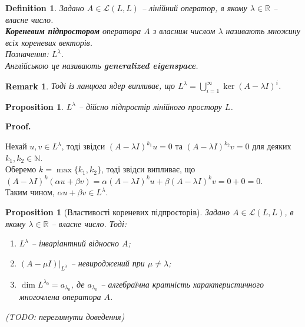 \documentclass[a4paper, 10pt]{article}
\makeatletter
\theoremstyle{theoremdd}
\newtheorem{definition}[theorem]{Definition}
\newtheorem{proposition}[theorem]{Proposition}
\newtheorem{remark}[theorem]{Remark}
\renewenvironment{proof}[1][Proof.\\]{\par
\pushQED{\hfill \qed}%
\normalfont \topsep6\p@\@plus6\p@\relax
\trivlist
\item\relax
{\bfseries
#1\@addpunct{.}}\hspace\labelsep\ignorespaces
}{%
\popQED\endtrivlist\@endpefalse
}
\makeatother
\begin{document}
\begin{definition}
Задано $A \in \mathcal{L}(L,L)$ -- лінійний оператор, в якому $\lambda \in \mathbb{R}$ -- власне число.\\
\textbf{Кореневим підпростором} оператора $A$ з власним числом $\lambda$ називають множину всіх кореневих векторів.\\
Позначення: $L^\lambda$.\\
Англійською це називають \textbf{generalized eigenspace}.
\end{definition}

\begin{remark}
Тоді із ланцюга ядер випливає, що $L^\lambda = \displaystyle\bigcup_{i=1}^\infty \ker (A-\lambda I)^i$.
\end{remark}

\begin{proposition}
$L^\lambda$ -- дійсно підпростір лінійного простору $L$.
\end{proposition}

\begin{proof}
Нехай $u,v \in L^\lambda$, тоді звідси $(A-\lambda I)^{k_1}u = 0$ та $(A-\lambda I)^{k_2}v = 0$ для деяких $k_1,k_2 \in \mathbb{N}$.\\
Оберемо $k = \max \{k_1,k_2\}$, тоді звідси випливає, що\\
$(A-\lambda I)^k (\alpha u + \beta v) = 
\alpha (A-\lambda I)^k u + \beta (A-\lambda I)^k v = 0 + 0 = 0$.\\
Таким чином, $\alpha u + \beta v \in L^\lambda$.
\end{proof}

\iffalse
\begin{proposition}
Задано $A: L \to L$ - лінійний оператор та $\dim L = n$. Тоді\\
$\{0\} \subset \underset{=L_\lambda}{\ker (A-\lambda I)} \subset \ker (A-\lambda I)^2 \subset \dots \subset \underset{=L^\lambda}{\ker (A-\lambda I)^n}$.\\
І далі $\ker (A-\lambda I)^n = \ker(A-\lambda I)^{n+1} = \ker(A-\lambda I)^{n+2} = \dots$.
\end{proposition}

\begin{proof}
\textit{Не до кінця зрозумів.}
\end{proof}
\fi

\begin{proposition}[Властивості кореневих підпросторів]
Задано $A \in \mathcal{L}(L,L)$, в якому $\lambda \in \mathbb{R}$ -- власне число. Тоді:
\begin{enumerate}[nosep,wide=0pt,label={\arabic*)}]
\item $L^\lambda$ -- інваріантний відносно $A$;
\item $(A-\mu I)|_{L^\lambda}$ -- невироджений при $\mu \neq \lambda$;
\item $\dim L^{\lambda_0} = a_{\lambda_0}$, де $a_{\lambda_0}$ -- алгебраїчна кратність характеристичного многочлена оператора $A$.
\end{enumerate}
(TODO: переглянути доведення)
\end{proposition}
\end{document}
